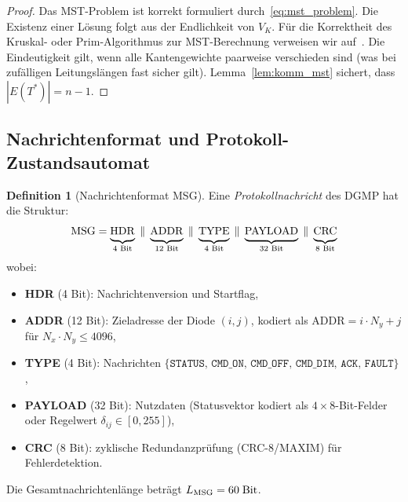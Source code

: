 ﻿\documentclass[a4paper,12pt]{article}
\theoremstyle{definition}
\newtheorem{definition}{Definition}[section]
\theoremstyle{remark}
\begin{document}
\begin{proof}
Das MST-Problem ist korrekt formuliert durch~\eqref{eq:mst_problem}. Die
Existenz einer Lösung folgt aus der Endlichkeit von $V_K$. Für die
Korrektheit des Kruskal- oder Prim-Algorithmus zur MST-Berechnung verweisen
wir auf~\cite{Korte2012}. Die Eindeutigkeit gilt, wenn alle Kantengewichte
paarweise verschieden sind (was bei zufälligen Leitungslängen fast sicher gilt).
Lemma~\ref{lem:komm_mst} sichert, dass $|E(T^*)| = n-1$.
\end{proof}

\subsection{Nachrichtenformat und Protokoll-Zustandsautomat}
\label{sec:komm_fsm}

\begin{definition}[Nachrichtenformat MSG]
\label{def:msg}
Eine \emph{Protokollnachricht} des DGMP hat die Struktur:
\begin{equation}
  \mathrm{MSG} = \underbrace{\vphantom{|}\mathrm{HDR}}_{\text{4 Bit}}
               \;\|\; \underbrace{\vphantom{|}\mathrm{ADDR}}_{\text{12 Bit}}
               \;\|\; \underbrace{\vphantom{|}\mathrm{TYPE}}_{\text{4 Bit}}
               \;\|\; \underbrace{\vphantom{|}\mathrm{PAYLOAD}}_{\text{32 Bit}}
               \;\|\; \underbrace{\vphantom{|}\mathrm{CRC}}_{\text{8 Bit}}
  \label{eq:msgformat}
\end{equation}
wobei:
\begin{itemize}
  \item \textbf{HDR} (4 Bit): Nachrichtenversion und Startflag,
  \item \textbf{ADDR} (12 Bit): Zieladresse der Diode $(i,j)$,
        kodiert als $\mathrm{ADDR} = i \cdot N_y + j$ für $N_x \cdot N_y \leq 4096$,
  \item \textbf{TYPE} (4 Bit): Nachrichten $\{\mathtt{STATUS},\,\mathtt{CMD\_ON},\,\mathtt{CMD\_OFF},\,
           \mathtt{CMD\_DIM},\,\mathtt{ACK},\,\mathtt{FAULT}\}$,
  \item \textbf{PAYLOAD} (32 Bit): Nutzdaten (Statusvektor kodiert
        als $4 \times 8$-Bit-Felder oder Regelwert $\delta_{ij} \in [0,255]$),
  \item \textbf{CRC} (8 Bit): zyklische Redundanzprüfung (CRC-8/MAXIM)
        für Fehlerdetektion.
\end{itemize}
Die Gesamtnachrichtenlänge beträgt $L_{\rm MSG} = 60\;\mathrm{Bit}$.
\end{definition}
\end{document}
